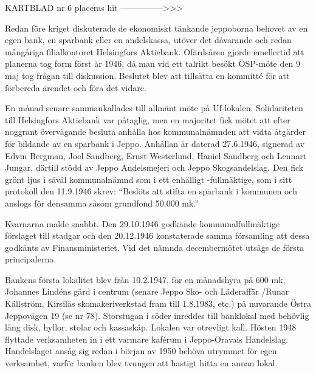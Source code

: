 
KARTBLAD nr 6 placeras hit --------------->>>







Redan före kriget diskuterade de ekonomiskt tänkande jeppoborna behovet av en egen bank, en sparbank eller en andelskassa, utöver det dåvarande och redan mångåriga filialkontoret Helsingfors Aktiebank. Ofärdsåren gjorde emellertid att planerna tog form först år 1946, då man vid ett talrikt besökt ÖSP-möte den 9 maj tog frågan till diskussion. Beslutet blev att tillsätta en kommitté för att förbereda ärendet och föra det vidare.

En månad senare sammankallades till allmänt möte på Uf-lokalen. Solidariteten till Helsingfors Aktiebank var påtaglig, men en majoritet fick mötet att efter noggrant övervägande besluta anhålla hos kommunalnämnden att vidta åtgärder för bildande av en sparbank i Jeppo. Anhållan är daterad 27.6.1946, signerad av Edvin Bergman, Joel Sandberg, Ernst Westerlund, Haniel Sandberg och Lennart Jungar, därtill stödd av Jeppo Andelsmejeri och Jeppo Skogsandelslag. Den fick grönt ljus i såväl kommunalnämnd som i ett enhälligt -fullmäktige, som i sitt protokoll den 11.9.1946 skrev: ``Beslöts att stifta en sparbank i kommunen och anslogs för densamma såsom grundfond 50.000 mk.''

Kvarnarna malde snabbt. Den 29.10.1946 godkände kommunalfullmäktige förslaget till stadgar och den 20.12.1946 konstaterade samma församling att dessa godkänts av Finansministeriet. Vid det nämnda decembermötet utsågs de första principalerna.

Bankens första lokalitet blev från 10.2.1947, för en månadshyra på 600 mk, Johannes Lindéns gård i centrum (senare Jeppo Sko- och Läderaffär /Runar Källström, Kirsiläs skomakeriverkstad fram till 1.8.1983, etc.) på nuvarande Östra Jeppovägen 19 (se nr 78). Storstugan i söder  inreddes till banklokal med behövlig lång disk, hyllor, stolar och kassaskåp. Lokalen var otrevligt kall. Hösten 1948 flyttade verksamheten in i ett varmare kaférum i Jeppo-Oravais Handelslag. Handelslaget ansåg sig redan i början av 1950 behöva utrymmet för egen verksamhet, varför banken blev tvungen att hastigt hitta en annan lokal.

